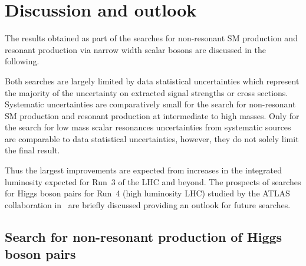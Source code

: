 \section{Discussion and outlook}%
\label{sec:result_discussion}

The results obtained as part of the searches for non-resonant SM \HH
production and resonant production via narrow width scalar bosons are
discussed in the following.

Both searches are largely limited by data statistical uncertainties
which represent the majority of the uncertainty on extracted signal
strengths or cross sections. Systematic uncertainties are
comparatively small for the search for non-resonant SM \HH production
and resonant production at intermediate to high masses. Only for the
search for low mass scalar resonances uncertainties from systematic
sources are comparable to data statistical uncertainties, however,
they do not solely limit the final result.

Thus the largest improvements are expected from increases in the
integrated luminosity expected for Run~3 of the LHC and beyond. The
prospects of searches for Higgs boson pairs for Run~4 (high luminosity
LHC) studied by the ATLAS collaboration
in~\cite{ATL-PHYS-PUB-2022-005} are briefly discussed providing an
outlook for future searches.


\subsection{Search for non-resonant production of Higgs boson pairs}

